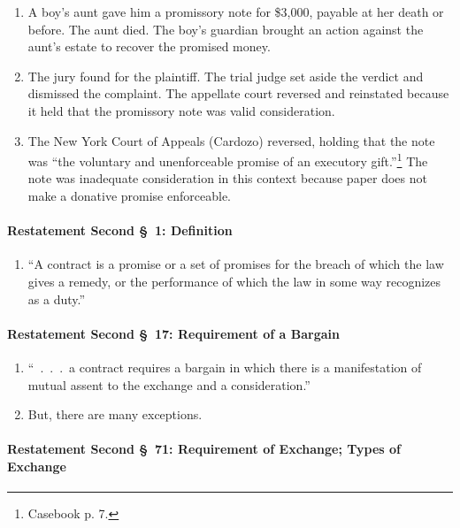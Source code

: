 \begin{enumerate}
    \item A boy's aunt gave him a promissory note for \$3,000, payable at her 
    death or before. The aunt died. The boy's guardian brought an action 
    against the aunt's estate to recover the promised money.
    \item The jury found for the plaintiff. The trial judge set aside the 
    verdict and dismissed the complaint. The appellate court reversed and 
    reinstated because it held that the promissory note was valid 
    consideration.
    \item The New York Court of Appeals (Cardozo) reversed, holding that the 
    note was ``the voluntary and unenforceable promise of an executory 
    gift.''\footnote{Casebook p. 7.} The note was inadequate consideration in 
    this context because paper does not make a donative promise enforceable.
\end{enumerate}

\paragraph{Restatement Second \S\ 1: Definition}

\begin{enumerate}
    \item ``A contract is a promise or a set of promises for the breach of 
    which the law gives a remedy, or the performance of which the law in some 
    way recognizes as a duty.''
\end{enumerate}

\paragraph{Restatement Second \S\ 17: Requirement of a Bargain}

\begin{enumerate}
    \item ``~.~.~.~a contract requires a bargain in which there is a 
    manifestation of mutual assent to the exchange and a consideration.''
    \item But, there are many exceptions.
\end{enumerate}

\paragraph{Restatement Second \S\ 71: Requirement of Exchange; Types of 
Exchange}

